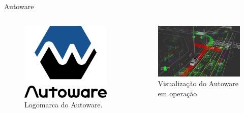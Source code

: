 \documentclass{if-beamer}
\begin{document}
\begin{frame}{Autoware}
	
	\begin{columns}
		
		\begin{column}{0.3\textwidth}
			
			\begin{figure}[H]
				\centering
				\includegraphics[width=\linewidth]{autoware_logo}
				\caption{Logomarca do Autoware.}
				\label{fig:autoware_logo}
			\end{figure}
			
		\end{column}
	
\pause
		
		\begin{column}{0.7\textwidth}
			
			\begin{figure}[H]
				\centering
				\includegraphics[width=0.9\linewidth]{autoware}
				\caption{Visualização do Autoware em operação \cite{gitautoware}}
				\label{fig:autoware}
			\end{figure}
			
		\end{column}
		
	\end{columns}
	
\end{frame}
\end{document}
